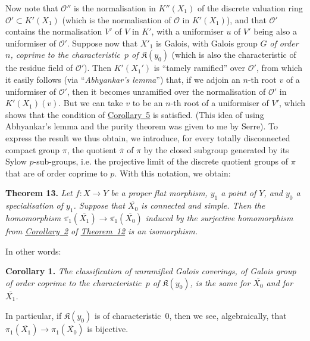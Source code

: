 \documentclass{article}
\newenvironment{itenv}[1]
  {\phantomsection\par\medskip\noindent\textbf{#1.}\itshape}
  {\par\medskip}
\newcommand{\scr}[1]{{\mathscr{#1}}}
\newcommand{\kres}{\mathfrak{K}}
\newcommand{\oldpage}[1]{\marginpar{\footnotesize$\Big\vert$ \textit{p.~#1}}}
\begin{document}
Now note that $\scr{O}''$ is the normalisation in $K''(X_1)$ of the discrete valuation ring $\scr{O}'\subset K'(X_1)$ (which is the normalisation of $\scr{O}$ in $K'(X_1)$), and that $\scr{O}'$ contains the normalisation $V'$ of $V$ in $K'$, with a uniformiser $u$ of $V'$ being also a uniformiser of $\scr{O}'$.
Suppose now that $X'_1$ is Galois, with Galois group $G$ \emph{of order $n$, coprime to the characteristic~$p$ of $\kres(y_0)$} (which is also the characteristic of the residue field of $\scr{O}'$).
Then $K'(X_1')$ is ``tamely ramified'' over $\scr{O}'$, from which it easily follows (via ``\emph{Abhyankar's lemma}'') that, if we adjoin an $n$-th root $v$ of a uniformiser of $\scr{O}'$, then it becomes unramified over the normalisation of $\scr{O}'$ in $K'(X_1)(v)$.
But we can take $v$ to be an $n$-th root of a uniformiser of $V'$, which shows that the condition of \hyperref[theorem12corollary5]{Corollary~5} is satisfied.
(This idea of using Abhyankar's lemma and the purity theorem was given to me by Serre).
To express the result we thus obtain, we introduce, for every totally disconnected compact group $\pi$, the quotient $\overline{\pi}$ of $\pi$ by the closed subgroup generated by its Sylow $p$-sub-groups, i.e. the projective limit of the discrete quotient groups of $\pi$ that are of order coprime to $p$.
With this notation, we obtain:

\begin{itenv}{Theorem 13}
\label{theorem13}
  Let $f\colon X\to Y$ be a proper flat morphism, $y_1$ a point of $Y$, and $y_0$ a specialisation of $y_1$.
  Suppose that $\overline{X_0}$ is connected and simple.
  Then the homomorphism $\overline{\pi_1}(\overline{X_1})\to\overline{\pi_1}(\overline{X_0})$ induced by the
\oldpage{182-27}
  surjective homomorphism from \hyperref[theorem12corollary2]{Corollary~2} of \hyperref[theorem12]{Theorem~12} is an \emph{isomorphism}.
\end{itenv}

In other words:

\begin{itenv}{Corollary 1}
\label{theorem13corollary1}
  The classification of unramified Galois coverings, of Galois group of order coprime to the characteristic~$p$ of $\kres(y_0)$, is the same for $\overline{X_0}$ and for $\overline{X_1}$.
\end{itenv}

In particular, if $\kres(y_0)$ is of characteristic~$0$, then we see, algebraically, that $\pi_1(\overline{X_1})\to\pi_1(\overline{X_0})$ is bijective.
\end{document}
